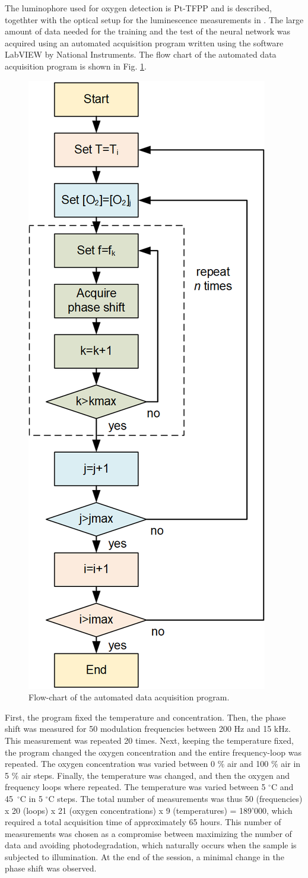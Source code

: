 \documentclass[sensors,article,submit,moreauthors,pdftex,10pt,a4paper]{Definitions/mdpi}
\begin{document}
The luminophore used for oxygen detection is Pt-TFPP and is described, togethter with the optical setup for the luminescence measurements in \cite{Venturini_2020}. 
The large amount of data needed for the training and the test of the neural network was acquired using an automated acquisition program written using the software LabVIEW by National Instruments. The flow chart of the automated data acquisition program is shown in Fig. \ref{fig:auto-data}.

\begin{figure}[t!]
\centering
\includegraphics[keepaspectratio, width=5.8 cm]{flow-chart.png}
\caption{Flow-chart of the automated data acquisition program.}
\label{fig:auto-data}
\end{figure}

First, the program fixed the temperature and concentration. Then, the phase shift was measured for 50 modulation frequencies between 200 Hz and 15 kHz. This measurement was repeated 20 times. Next, keeping the temperature fixed, the program changed the oxygen concentration and the entire frequency-loop was repeated.
The oxygen concentration was varied between 0 $\%$ air and 100 $\%$ air in 5 $\%$ air steps.
Finally, the temperature was changed, and then the oxygen and frequency loops where repeated. The temperature was varied between 5 $^\circ$C and 45~$^\circ$C in 5 $^\circ$C steps.
The total number of measurements was thus 50 (frequencies) x 20 (loops) x 21 (oxygen concentrations) x 9 (temperatures) = 189'000, which required a total acquisition time of approximately 65 hours. This number of measurements was chosen as a compromise between maximizing the number of data and avoiding photodegradation, which naturally occurs when the sample is subjected to illumination. At the end of the session, a minimal change in the phase shift was observed.
\end{document}
